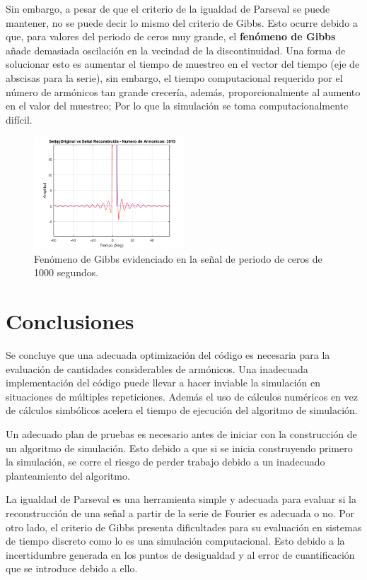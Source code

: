 \documentclass[11pt,a4paper,twocolumn]{article}
\begin{document}
    Sin embargo, a pesar de que el criterio de la igualdad de Parseval se puede mantener, no 
    se puede decir lo mismo del criterio de Gibbs. Esto ocurre debido a que, para valores del 
    periodo de ceros muy grande, el \textbf{fenómeno de Gibbs} añade demasiada oscilación en la 
    vecindad de la discontinuidad. Una forma de solucionar esto es aumentar el tiempo de 
    muestreo en el vector del tiempo (eje de abscisas para la serie), sin embargo, el tiempo 
    computacional requerido por el número de armónicos tan grande crecería, además, 
    proporcionalmente al aumento en el valor del muestreo; Por lo que la simulación se toma 
    computacionalmente difícil.

    \begin{figure}[H]
        \centering
        \includegraphics[width=0.5\textwidth]{img/figure10.png}
        \caption{Fenómeno de Gibbs evidenciado en la señal de periodo de ceros de 1000 segundos.}
        \label{figure10}
    \end{figure}

\section*{Conclusiones}
    
    Se concluye que una adecuada optimización del código es necesaria para la evaluación de cantidades 
    considerables de armónicos. Una inadecuada implementación del código puede llevar a hacer inviable 
    la simulación en situaciones de múltiples repeticiones. Además el uso de cálculos numéricos en vez 
    de cálculos simbólicos acelera el tiempo de ejecución del algoritmo de simulación.
    
    Un adecuado plan de pruebas es necesario antes de iniciar con la construcción de un algoritmo 
    de simulación. Esto debido a que si se inicia construyendo primero la simulación, se corre el 
    riesgo de perder trabajo debido a un inadecuado planteamiento del algoritmo.
    
    La igualdad de Parseval es una herramienta simple y adecuada para evaluar si la reconstrucción de 
    una señal a partir de la serie de Fourier es adecuada o no. Por otro lado, el criterio de Gibbs 
    presenta dificultades para su evaluación en sistemas de tiempo discreto como lo es una simulación 
    computacional. Esto debido a la incertidumbre generada en los puntos de desigualdad y al error de 
    cuantificación que se introduce debido a ello.
    
\end{document}
